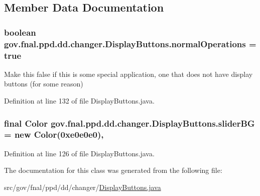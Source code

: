 \subsection{Member Data Documentation}
\hypertarget{classgov_1_1fnal_1_1ppd_1_1dd_1_1changer_1_1DisplayButtons_aee30976132133400c5f8cb6a48599aa9}{
\subsubsection[{normal\-Operations}]{\setlength{\rightskip}{0pt plus 5cm}boolean gov.\-fnal.\-ppd.\-dd.\-changer.\-Display\-Buttons.\-normal\-Operations = true\hspace{0.3cm}{\ttfamily [static]}}}\label{classgov_1_1fnal_1_1ppd_1_1dd_1_1changer_1_1DisplayButtons_aee30976132133400c5f8cb6a48599aa9}
Make this false if this is some special application, one that does not have display buttons (for some reason) 

Definition at line 132 of file Display\-Buttons.\-java.

\hypertarget{classgov_1_1fnal_1_1ppd_1_1dd_1_1changer_1_1DisplayButtons_ab2b83431c13a58c3f26a01086ec4ac8d}{
\subsubsection[{slider\-B\-G}]{\setlength{\rightskip}{0pt plus 5cm}final Color gov.\-fnal.\-ppd.\-dd.\-changer.\-Display\-Buttons.\-slider\-B\-G = new Color(0xe0e0e0)\hspace{0.3cm}{\ttfamily [static]}, {\ttfamily [protected]}}}\label{classgov_1_1fnal_1_1ppd_1_1dd_1_1changer_1_1DisplayButtons_ab2b83431c13a58c3f26a01086ec4ac8d}


Definition at line 126 of file Display\-Buttons.\-java.



The documentation for this class was generated from the following file\-:\begin{DoxyCompactItemize}
\item 
src/gov/fnal/ppd/dd/changer/\hyperlink{DisplayButtons_8java}{Display\-Buttons.\-java}\end{DoxyCompactItemize}
